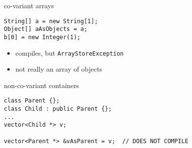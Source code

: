 \begin{frame}[fragile,label=covArr]{co-variant arrays}
\lstset{language=Java,style=small}
\begin{lstlisting}
String[] a = new String[1];
Object[] aAsObjects = a;
b[0] = new Integer(1);
\end{lstlisting}
\begin{itemize}
\item compiles, but \texttt{ArrayStoreException}
\item not really an array of objects
\end{itemize}
\end{frame}

\begin{frame}[fragile,label=nonCovArr]{non-co-variant containers}
\lstset{language=C++,style=small}
\begin{lstlisting}
class Parent {};
class Child : public Parent {};
...
vector<Child *> v;

vector<Parent *> &vAsParent = v;  // DOES NOT COMPILE
\end{lstlisting}
\end{frame}
